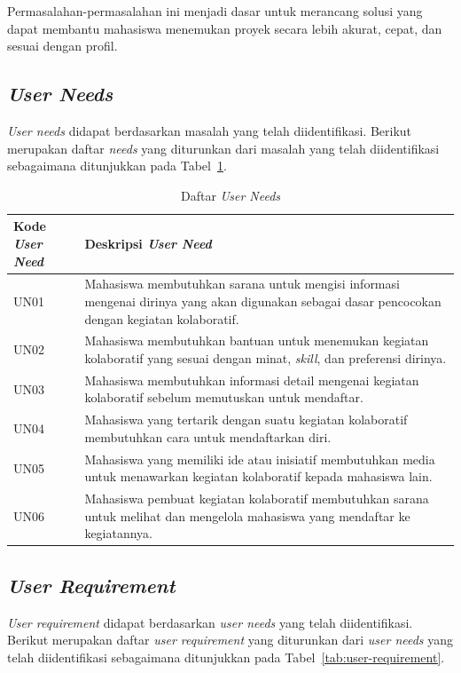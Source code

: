 Permasalahan-permasalahan ini menjadi dasar untuk merancang solusi yang dapat membantu mahasiswa menemukan proyek secara lebih akurat, cepat, dan sesuai dengan profil.

\subsection{\emph{User Needs}}

\emph{User needs} didapat berdasarkan masalah yang telah diidentifikasi. Berikut merupakan daftar \emph{needs} yang diturunkan dari masalah yang telah diidentifikasi sebagaimana ditunjukkan pada Tabel~\ref{tab:user-needs}.

\begin{table}[H]
  \caption{Daftar \emph{User Needs}}
  \label{tab:user-needs}
  \begin{tabularx}{\textwidth}{p{2.5cm} X}
    \toprule
    \textbf{Kode \emph{User Need}} & \textbf{Deskripsi \emph{User Need}} \\
    \midrule
    UN01 & Mahasiswa membutuhkan sarana untuk mengisi informasi mengenai dirinya yang akan digunakan sebagai dasar pencocokan dengan kegiatan kolaboratif. \\
    \midrule
    UN02 & Mahasiswa membutuhkan bantuan untuk menemukan kegiatan kolaboratif yang sesuai dengan minat, \emph{skill}, dan preferensi dirinya. \\
    \midrule
    UN03 & Mahasiswa membutuhkan informasi detail mengenai kegiatan kolaboratif sebelum memutuskan untuk mendaftar. \\
    \midrule
    UN04 & Mahasiswa yang tertarik dengan suatu kegiatan kolaboratif membutuhkan cara untuk mendaftarkan diri. \\
    \midrule
    UN05 & Mahasiswa yang memiliki ide atau inisiatif membutuhkan media untuk menawarkan kegiatan kolaboratif kepada mahasiswa lain. \\
    \midrule
    UN06 & Mahasiswa pembuat kegiatan kolaboratif membutuhkan sarana untuk melihat dan mengelola mahasiswa yang mendaftar ke kegiatannya. \\
    \bottomrule
  \end{tabularx}
\end{table}

\subsection{\emph{User Requirement}}

\emph{User requirement} didapat berdasarkan \emph{user needs} yang telah diidentifikasi. Berikut merupakan daftar \emph{user requirement} yang diturunkan dari \emph{user needs} yang telah diidentifikasi sebagaimana ditunjukkan pada Tabel~\ref{tab:user-requirement}.

